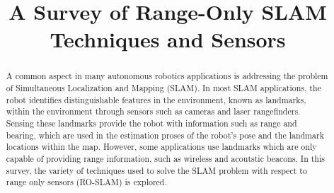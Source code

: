 \documentclass[conference]{IEEEtran}
\begin{document}
	\title{A Survey of Range-Only SLAM Techniques and Sensors}
	
	\author{
	}
	
	
	
	
	
	
	
	
	
	
	\maketitle
	
	
	
	
	
	\begin{abstract}		
		A common aspect in many autonomous robotics applications is addressing the problem of Simultaneous Localization and Mapping (SLAM). In most SLAM applications, the robot identifies distinguishable features in the environment, known as landmarks, within the environment through sensors such as cameras and laser rangefinders. Sensing these landmarks provide the robot with information such as range and bearing, which are used in the estimation proses of the robot's pose and the landmark locations within the map. However, some applications use landmarks which are only capable of providing range information, such as wireless and acoutstic beacons. In this survey, the variety of techniques used to solve the SLAM problem with respect to range only sensors (RO-SLAM) is explored.
	\end{abstract}
	
\end{document}
